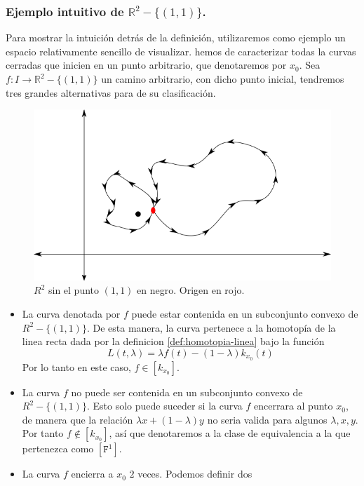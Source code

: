 {\subsubsection{Ejemplo intuitivo de \(\mathbb{R}^2 - \{(1,1)\}\).}
Para mostrar la intuición detrás de la definición, utilizaremos como
ejemplo un espacio relativamente sencillo de visualizar. hemos de
caracterizar todas la curvas cerradas que inicien en un punto
arbitrario, que denotaremos por \(x_0\). Sea \(f : I \to \mathbb{R}^2 -
\{(1,1)\}\) un camino arbitrario, con dicho punto inicial, tendremos
tres grandes alternativas para de su clasificación.
\begin{figure}[h]
  \centering
  \includegraphics[scale=0.5]{./imagenes/R2-punto.png}
  \caption{\(R^2\) sin el punto \((1,1)\) en negro. Origen en rojo. }
  \label{fig:R2-sin-punto}
\end{figure}
\begin{itemize}
\item La curva denotada por \(f\) puede estar contenida en un subconjunto
  convexo de \(R^2 - \{(1,1)\}\). De esta manera, la curva pertenece a la
  homotopía de la linea recta dada por la definicion
  \ref{def:homotopia-linea} bajo la función
  \[ L (t,\lambda) = \lambda f (t) - (1 - \lambda) k_{x_0} (t)\]
  Por lo tanto en este caso, \(f \in [k_{x_0}]\).
\item La curva \(f\) no puede ser contenida en un subconjunto convexo de
  \(R^2 - \{ (1,1)\}\). Esto solo puede suceder si la curva \(f\)
  encerrara al punto \(x_0\), de manera que la relación \(\lambda x +
  (1 - \lambda) y\) no seria valida para algunos \(\lambda, x, y\). Por
  tanto \(f \not \in [k_{x_0}]\), así que denotaremos a la clase de
  equivalencia a la que pertenezca como \([\mathtt{F}^1]\).
\item La curva \(f\) encierra a \(x_0\) \(2\) veces. Podemos definir dos

\end{itemize}}
